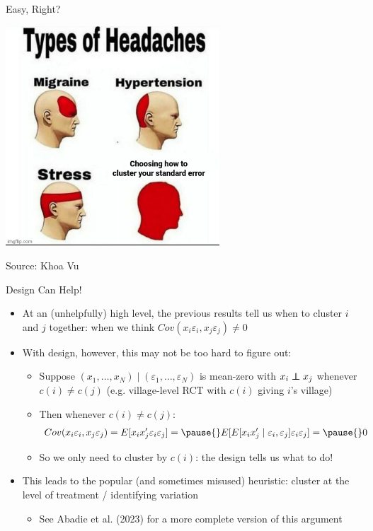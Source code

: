 \documentclass[11pt,english]{beamer}
\newcommand\independent{\protect\mathpalette{\protect\independenT}{\perp}}
\def\independenT#1#2{\mathrel{\rlap{$#1#2$}\mkern2mu{#1#2}}}
\begin{document}
\begin{frame}{Easy, Right?}

\begin{center}
	\includegraphics[width=0.6\textwidth]{figures/khoa_cluster.jpg}
\end{center}
\hspace{\fill}Source: Khoa Vu 
\end{frame}

\begin{frame}{Design Can Help!} 
\begin{itemize}
\item At an (unhelpfully) high level, the previous results tell us when to cluster $i$ and $j$ together: when we think $Cov(x_i\varepsilon_i,x_j\varepsilon_j)\neq 0$\bigskip\pause{}
\item With design, however, this may not be too hard to figure out:\smallskip
\begin{itemize}
\item Suppose $(x_1,\dots,x_N)
\mid (\varepsilon_1,\dots,\varepsilon_N)$ is mean-zero with $x_i\independent x_j$ whenever $c(i)\neq c(j)$ (e.g. village-level RCT with $c(i)$ giving $i$'s village)\smallskip\pause{}
\item Then whenever $c(i)\neq c(j)$: 
\begin{align*}
Cov(x_i\varepsilon_i,x_j\varepsilon_j)=E[x_ix_j^\prime\varepsilon_i\varepsilon_j]=\pause{}E[E[x_ix_j^\prime\mid \varepsilon_i,\varepsilon_j] \varepsilon_i\varepsilon_j]=\pause{} 0
\end{align*}\vspace{-0.6cm}\pause{}
\item So we only need to cluster by $c(i)$: the design tells us what to do!
\end{itemize}\bigskip\pause{}

\item This leads to the popular (and sometimes misused) heuristic: cluster at the level of treatment / identifying variation\smallskip
\begin{itemize}
\item See Abadie et al. (2023) for a more complete version of this argument 
\end{itemize}
\end{itemize}

\end{frame}
\end{document}
